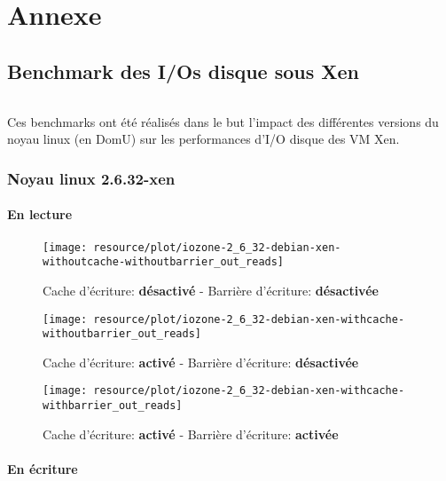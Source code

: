 \part{Annexe}
\chapter{Benchmark des I/Os disque sous Xen}

\paragraph*{}
Ces benchmarks ont été réalisés dans le but l'impact des différentes versions du noyau linux
(en DomU) sur les performances d'I/O disque des VM Xen.


\section{Noyau linux 2.6.32-xen}

\subsection*{En lecture}

\begin{figure}[H]
	\centering
	\texttt{[image: resource/plot/iozone-2\_6\_32-debian-xen-withoutcache-withoutbarrier\_out\_reads]}
	\caption{Cache d'écriture: \textbf{désactivé}   -   Barrière d'écriture: \textbf{désactivée}}
\end{figure}

\begin{figure}[H]
	\centering
	\texttt{[image: resource/plot/iozone-2\_6\_32-debian-xen-withcache-withoutbarrier\_out\_reads]}
	\caption{Cache d'écriture: \textbf{activé}   -   Barrière d'écriture: \textbf{désactivée}}
\end{figure}

\begin{figure}[H]
	\centering
	\texttt{[image: resource/plot/iozone-2\_6\_32-debian-xen-withcache-withbarrier\_out\_reads]}
	\caption{Cache d'écriture: \textbf{activé}   -   Barrière d'écriture: \textbf{activée}}
\end{figure}

\subsection*{En écriture}

